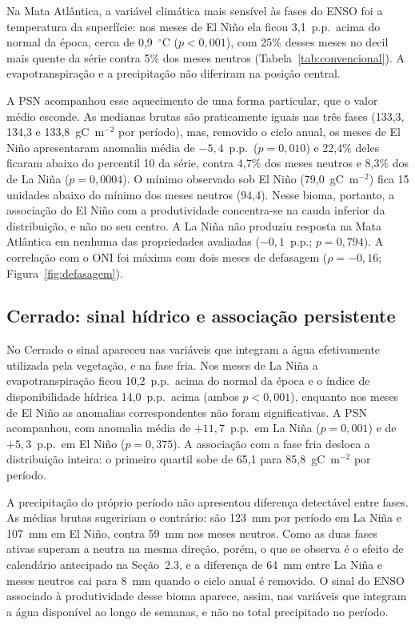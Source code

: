 \documentclass[a4paper,fleqn]{cas-sc}
\begin{document}
Na Mata Atlântica, a variável climática mais sensível às fases do ENSO foi a temperatura da superfície: nos meses de El Niño ela ficou 3,1~p.p.\ acima do normal da época, cerca de 0,9~$^{\circ}$C ($p < 0{,}001$), com 25\% desses meses no decil mais quente da série contra 5\% dos meses neutros (Tabela~\ref{tab:convencional}). A evapotranspiração e a precipitação não diferiram na posição central.

A PSN acompanhou esse aquecimento de uma forma particular, que o valor médio esconde. As medianas brutas são praticamente iguais nas três fases (133,3, 134,3 e 133,8~gC~m$^{-2}$ por período), mas, removido o ciclo anual, os meses de El Niño apresentaram anomalia média de $-5{,}4$~p.p.\ ($p = 0{,}010$) e 22,4\% deles ficaram abaixo do percentil 10 da série, contra 4,7\% dos meses neutros e 8,3\% dos de La Niña ($p = 0{,}0004$). O mínimo observado sob El Niño (79,0~gC~m$^{-2}$) fica 15 unidades abaixo do mínimo dos meses neutros (94,4). Nesse bioma, portanto, a associação do El Niño com a produtividade concentra-se na cauda inferior da distribuição, e não no seu centro. A La Niña não produziu resposta na Mata Atlântica em nenhuma das propriedades avaliadas ($-0{,}1$~p.p.; $p = 0{,}794$). A correlação com o ONI foi máxima com dois meses de defasagem ($\rho = -0{,}16$; Figura~\ref{fig:defasagem}).

\subsection{Cerrado: sinal hídrico e associação persistente}

No Cerrado o sinal apareceu nas variáveis que integram a água efetivamente utilizada pela vegetação, e na fase fria. Nos meses de La Niña a evapotranspiração ficou 10,2~p.p.\ acima do normal da época e o índice de disponibilidade hídrica 14,0~p.p.\ acima (ambos $p < 0{,}001$), enquanto nos meses de El Niño as anomalias correspondentes não foram significativas. A PSN acompanhou, com anomalia média de $+11{,}7$~p.p.\ em La Niña ($p = 0{,}001$) e de $+5{,}3$~p.p.\ em El Niño ($p = 0{,}375$). A associação com a fase fria desloca a distribuição inteira: o primeiro quartil sobe de 65,1 para 85,8~gC~m$^{-2}$ por período.

A precipitação do próprio período não apresentou diferença detectável entre fases. As médias brutas sugeririam o contrário: são 123~mm por período em La Niña e 107~mm em El Niño, contra 59~mm nos meses neutros. Como as duas fases ativas superam a neutra na mesma direção, porém, o que se observa é o efeito de calendário antecipado na Seção~2.3, e a diferença de 64~mm entre La Niña e meses neutros cai para 8~mm quando o ciclo anual é removido. O sinal do ENSO associado à produtividade desse bioma aparece, assim, nas variáveis que integram a água disponível ao longo de semanas, e não no total precipitado no período.
\end{document}
